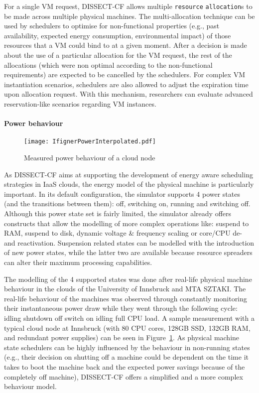 \documentclass[sort, compress, 5p]{elsarticle}
\begin{document}
For a single VM request, DISSECT-CF allows multiple \verb+resource+ \verb+allocation+s to be made across multiple physical machines. The multi-allocation technique can be used by schedulers to optimise for non-functional properties (e.g., past availability, expected energy consumption, environmental impact) of those resources that a VM could bind to at a given moment. After a decision is made about the use of a particular allocation for the VM request, the rest of the allocations (which were non optimal according to the non-functional requirements) are expected to be cancelled by the schedulers. For complex VM instantiation scenarios, schedulers are also allowed to adjust the expiration time upon allocation request. With this mechanism, researchers can evaluate advanced reservation-like scenarios regarding VM instances.

\paragraph{Power behaviour} 

\begin{figure}[tb]
\centering
\texttt{[image: IfignerPowerInterpolated.pdf]}
\caption{Measured power behaviour of a cloud node\label{FIG-PMbehaviour}}
\end{figure}

As DISSECT-CF aims at supporting the development of energy aware scheduling strategies in IaaS clouds, the energy model of the physical machine is particularly important. In its default configuration, the simulator supports 4 power states (and the transitions between them): off, switching on, running and switching off. Although this power state set is fairly limited, the simulator already offers constructs that allow the modelling of more complex operations like: suspend to RAM, suspend to disk, dynamic voltage \& frequency scaling or core/CPU de- and reactivation. Suspension related states can be modelled with the introduction of new power states, while the latter two are available because resource spreaders can alter their maximum processing capabilities.

The modelling of the 4 supported states was done after real-life physical machine behaviour in the clouds of the University of Innsbruck and MTA SZTAKI. The real-life behaviour of the machines was observed through constantly monitoring their instantaneous power draw while they went through the following cycle: idling  shutdown  off  switch on  idling  full CPU load. A sample measurement with a typical cloud node at Innsbruck (with 80 CPU cores, 128GB SSD, 132GB RAM, and redundant power supplies) can be seen in Figure~\ref{FIG-PMbehaviour}. As physical machine state schedulers can be highly influenced by the behaviour in non-running states (e.g., their decision on shutting off a machine could be dependent on the time it takes to boot the machine back and the expected power savings because of the completely off machine), DISSECT-CF offers a simplified and a more complex behaviour model. 
\end{document}
